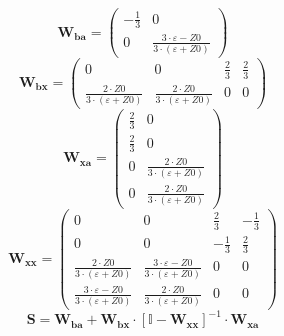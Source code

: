 \[ \mathbf{W_{ba}} = \left(\begin{array}{cc} -\frac{1}{3} & 0 \\ 0 &
\frac{3\cdot \varepsilon-Z0}{3\cdot \left(\varepsilon+Z0\right)}
\end{array}\right) \]
\[ \mathbf{W_{bx}} = \left(\begin{array}{cccc} 0 & 0 & \frac{2}{3} &
\frac{2}{3} \\ \frac{2\cdot Z0}{3\cdot \left(\varepsilon+Z0\right)} &
\frac{2\cdot Z0}{3\cdot \left(\varepsilon+Z0\right)} & 0 & 0
\end{array}\right) \]
\[ \mathbf{W_{xa}} = \left(\begin{array}{cc} \frac{2}{3} & 0 \\
\frac{2}{3} & 0 \\ 0 & \frac{2\cdot Z0}{3\cdot
\left(\varepsilon+Z0\right)} \\ 0 & \frac{2\cdot Z0}{3\cdot
\left(\varepsilon+Z0\right)} \end{array}\right) \]
\[ \mathbf{W_{xx}} = \left(\begin{array}{cccc} 0 & 0 & \frac{2}{3} &
-\frac{1}{3} \\ 0 & 0 & -\frac{1}{3} & \frac{2}{3} \\ \frac{2\cdot
Z0}{3\cdot \left(\varepsilon+Z0\right)} & \frac{3\cdot
\varepsilon-Z0}{3\cdot \left(\varepsilon+Z0\right)} & 0 & 0 \\
\frac{3\cdot \varepsilon-Z0}{3\cdot \left(\varepsilon+Z0\right)} &
\frac{2\cdot Z0}{3\cdot \left(\varepsilon+Z0\right)} & 0 & 0
\end{array}\right) \]
\[ \mathbf{S}=\mathbf{W_{ba}}+\mathbf{W_{bx}}\cdot\left[ \mathbb{I}
-\mathbf{W_{xx}}\right]^{-1}\cdot\mathbf{W_{xa}} \]
